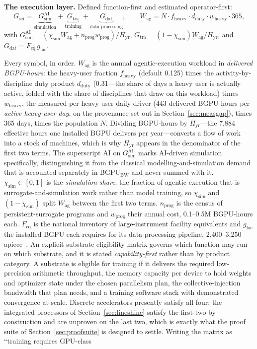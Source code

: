 

\textbf{The execution layer.} Defined function-first and estimated operator-first:
\[
G_{\mathrm{sci}} = \underbrace{G^{\mathrm{AI}}_{\mathrm{sim}}}_{\text{simulation}} + \underbrace{G_{\mathrm{tra}}}_{\text{training}} + \underbrace{G_{\mathrm{dat}}}_{\text{data processing}},
\qquad
W_{\mathrm{ag}} = N\cdot f_{\mathrm{heavy}}\cdot d_{\mathrm{duty}}\cdot w_{\mathrm{heavy}}\cdot 365 ,
\]
with $G^{\mathrm{AI}}_{\mathrm{sim}} = (\chi_{\mathrm{sim}}W_{\mathrm{ag}} + n_{\mathrm{prog}}w_{\mathrm{prog}})/H_{\mathrm{yr}}$, $G_{\mathrm{tra}} = (1-\chi_{\mathrm{sim}})W_{\mathrm{ag}}/H_{\mathrm{yr}}$, and $G_{\mathrm{dat}} = F_{\mathrm{eq}}\,g_{\mathrm{fac}}$.

Every symbol, in order. $W_{\mathrm{ag}}$ is the annual agentic-execution workload in \emph{delivered BGPU-hours}: the heavy-user fraction $f_{\mathrm{heavy}}$ (default 0.125) times the activity-by-discipline duty product $d_{\mathrm{duty}}$ (0.31---the share of days a heavy user is actually active, folded with the share of disciplines that draw on this workload) times $w_{\mathrm{heavy}}$, the measured per-heavy-user daily driver (443 delivered BGPU-hours per \emph{active heavy-user day}, on the provenance set out in Section~\ref{sec:measgap}), times 365 days, times the population $N$. Dividing BGPU-hours by $H_{\mathrm{yr}}$---the 7,884 effective hours one installed BGPU delivers per year---converts a flow of work into a stock of machines, which is why $H_{\mathrm{yr}}$ appears in the denominator of the first two terms. The superscript AI on $G^{\mathrm{AI}}_{\mathrm{sim}}$ marks AI-driven simulation specifically, distinguishing it from the classical modelling-and-simulation demand that is accounted separately in BGPU$_{\mathrm{BW}}$ and never summed with it. $\chi_{\mathrm{sim}} \in [0,1]$ is the \emph{simulation share}: the fraction of agentic execution that is surrogate-and-simulation work rather than model training, so $\chi_{\mathrm{sim}}$ and $(1-\chi_{\mathrm{sim}})$ split $W_{\mathrm{ag}}$ between the first two terms. $n_{\mathrm{prog}}$ is the census of persistent-surrogate programs and $w_{\mathrm{prog}}$ their annual cost, 0.1--0.5M BGPU-hours each. $F_{\mathrm{eq}}$ is the national inventory of large-instrument facility equivalents and $g_{\mathrm{fac}}$ the installed BGPU each requires for its data-processing pipeline, 2,400--3,250 apiece~\cite{ai4s-framework}. An explicit substrate-eligibility matrix governs which function may run on which substrate, and it is stated \emph{capability-first} rather than by product category. A substrate is eligible for training if it delivers the required low-precision arithmetic throughput, the memory capacity per device to hold weights and optimizer state under the chosen parallelism plan, the collective-injection bandwidth that plan needs, and a training software stack with demonstrated convergence at scale. Discrete accelerators presently satisfy all four; the integrated processors of Section~\ref{sec:lineshine} satisfy the first two by construction and are unproven on the last two, which is exactly what the proof suite of Section~\ref{sec:proofsuite} is designed to settle. Writing the matrix as ``training requires GPU-class 